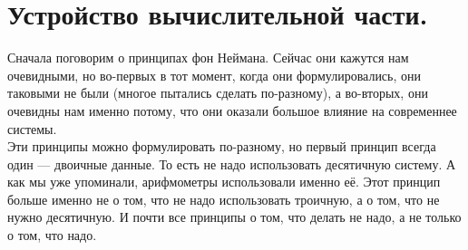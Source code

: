 \documentclass{article}
\begin{document}
    \section{Устройство вычислительной части.}
    Сначала поговорим о принципах фон Неймана. Сейчас они кажутся нам очевидными, но во-первых в тот момент, когда они формулировались, они таковыми не были (многое пытались сделать по-разному), а во-вторых, они очевидны нам именно потому, что они оказали большое влияние на современнее системы.\\
    Эти принципы можно формулировать по-разному, но первый принцип всегда один --- двоичные данные. То есть не надо использовать десятичную систему. А как мы уже упоминали, арифмометры использовали именно её. Этот принцип больше именно не о том, что не надо использовать троичную, а о том, что не нужно десятичную. И почти все принципы о том, что делать не надо, а не только о том, что надо.\\
\end{document}
